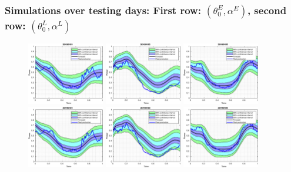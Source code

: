 \documentclass[aspectratio=169]{beamer}\usepackage[utf8]{inputenc}
\begin{document}
\begin{frame}\frametitle{Simulations over testing days: First row: $(\theta_0^E,\alpha^E)$, second row: $(\theta_0^L,\alpha^L)$}

\begin{figure}[ht!]
\centering
\includegraphics[width=0.3\textwidth]{../../MATLAB_Files/Results/bands_testing_days/optimal_value/1.eps}
\includegraphics[width=0.3\textwidth]{../../MATLAB_Files/Results/bands_testing_days/optimal_value/2.eps}
\includegraphics[width=0.3\textwidth]{../../MATLAB_Files/Results/bands_testing_days/optimal_value/3.eps}
\includegraphics[width=0.3\textwidth]{../../MATLAB_Files/Results/bands_testing_days/Optimal_Lamperti/1.eps}
\includegraphics[width=0.3\textwidth]{../../MATLAB_Files/Results/bands_testing_days/Optimal_Lamperti/2.eps}
\includegraphics[width=0.3\textwidth]{../../MATLAB_Files/Results/bands_testing_days/Optimal_Lamperti/3.eps}
\end{figure}

\end{frame}
\end{document}
